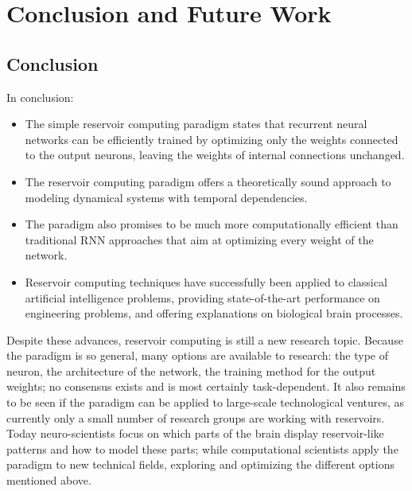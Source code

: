 \documentclass[12pt,oneside]{CUNY_CS_PhD}
\begin{document}
\chapter{Conclusion and Future Work} 

\section{Conclusion}
In conclusion:
\begin{itemize}[noitemsep]
\item The simple reservoir computing paradigm states that recurrent neural networks can be efficiently trained by optimizing only the weights connected to the output neurons, leaving the weights of internal connections unchanged. 
\item The reservoir computing paradigm offers a theoretically sound approach to modeling dynamical systems with temporal dependencies. 
\item The paradigm also promises to be much more computationally efficient than traditional RNN approaches that aim at optimizing every weight of the network.
\item Reservoir computing techniques have successfully been applied to classical artificial intelligence problems, providing state-of-the-art performance on engineering problems, and offering explanations on biological brain processes.
\end{itemize}

Despite these advances, reservoir computing is still a new research topic. Because the paradigm is so general, many options are available to research: the type of neuron, the architecture of the network, the training method for the output weights; no consensus exists and is most certainly task-dependent. It also remains to be seen if the paradigm can be applied to large-scale technological ventures, as currently only a small number of research groups are working with reservoirs. Today neuro-scientists focus on which parts of the brain display reservoir-like patterns and how to model these parts; while computational scientists apply the paradigm to new technical fields, exploring and optimizing the different options mentioned above. 
\end{document}
